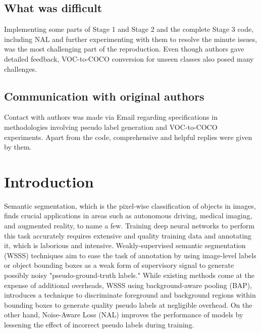 \subsection*{What was difficult}
Implementing some parts of Stage 1 and Stage 2 and the complete Stage 3 code, including NAL and further experimenting with them to resolve the minute issues, was the most challenging part of the reproduction. Even though authors gave detailed feedback, VOC-to-COCO conversion for unseen classes also posed many challenges.

\subsection*{Communication with original authors}

Contact with authors was made via Email regarding specifications in methodologies involving pseudo label generation and VOC-to-COCO experiments. Apart from the code, comprehensive and helpful replies were given by them.


\section{Introduction}
Semantic segmentation, which is the pixel-wise classification of objects in images, finds crucial applications in areas such as autonomous driving, medical imaging, and augmented reality, to name a few. Training deep neural networks to perform this task accurately requires extensive and quality training data and annotating it, which is laborious and intensive. Weakly-supervised semantic segmentation (WSSS) techniques aim to ease the task of annotation by using image-level labels or object bounding boxes as a weak form of supervisory signal to generate possibly noisy "pseudo-ground-truth labels." While existing methods come at the expense of additional overheads, WSSS using background-aware pooling (BAP), introduces a technique to discriminate foreground and background regions within bounding boxes to generate quality pseudo labels at negligible overhead. On the other hand, Noise-Aware Loss (NAL) improves the performance of models by lessening the effect of incorrect pseudo labels during training.

